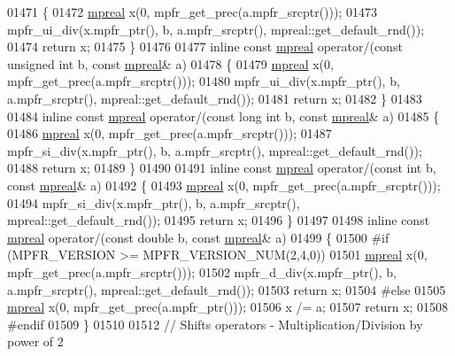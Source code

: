 \begin{DoxyCode}
01471 \{
01472     \hyperlink{classmpfr_1_1mpreal}{mpreal} x(0, mpfr\_get\_prec(a.mpfr\_srcptr()));
01473     mpfr\_ui\_div(x.mpfr\_ptr(), b, a.mpfr\_srcptr(), mpreal::get\_default\_rnd());
01474     \textcolor{keywordflow}{return} x;
01475 \}
01476 
01477 \textcolor{keyword}{inline} \textcolor{keyword}{const} \hyperlink{classmpfr_1_1mpreal}{mpreal} operator/(\textcolor{keyword}{const} \textcolor{keywordtype}{unsigned} \textcolor{keywordtype}{int} b, \textcolor{keyword}{const} \hyperlink{classmpfr_1_1mpreal}{mpreal}& a)
01478 \{
01479     \hyperlink{classmpfr_1_1mpreal}{mpreal} x(0, mpfr\_get\_prec(a.mpfr\_srcptr()));
01480     mpfr\_ui\_div(x.mpfr\_ptr(), b, a.mpfr\_srcptr(), mpreal::get\_default\_rnd());
01481     \textcolor{keywordflow}{return} x;
01482 \}
01483 
01484 \textcolor{keyword}{inline} \textcolor{keyword}{const} \hyperlink{classmpfr_1_1mpreal}{mpreal} operator/(\textcolor{keyword}{const} \textcolor{keywordtype}{long} \textcolor{keywordtype}{int} b, \textcolor{keyword}{const} \hyperlink{classmpfr_1_1mpreal}{mpreal}& a)
01485 \{
01486     \hyperlink{classmpfr_1_1mpreal}{mpreal} x(0, mpfr\_get\_prec(a.mpfr\_srcptr()));
01487     mpfr\_si\_div(x.mpfr\_ptr(), b, a.mpfr\_srcptr(), mpreal::get\_default\_rnd());
01488     \textcolor{keywordflow}{return} x;
01489 \}
01490 
01491 \textcolor{keyword}{inline} \textcolor{keyword}{const} \hyperlink{classmpfr_1_1mpreal}{mpreal} operator/(\textcolor{keyword}{const} \textcolor{keywordtype}{int} b, \textcolor{keyword}{const} \hyperlink{classmpfr_1_1mpreal}{mpreal}& a)
01492 \{
01493     \hyperlink{classmpfr_1_1mpreal}{mpreal} x(0, mpfr\_get\_prec(a.mpfr\_srcptr()));
01494     mpfr\_si\_div(x.mpfr\_ptr(), b, a.mpfr\_srcptr(), mpreal::get\_default\_rnd());
01495     \textcolor{keywordflow}{return} x;
01496 \}
01497 
01498 \textcolor{keyword}{inline} \textcolor{keyword}{const} \hyperlink{classmpfr_1_1mpreal}{mpreal} operator/(\textcolor{keyword}{const} \textcolor{keywordtype}{double}  b, \textcolor{keyword}{const} \hyperlink{classmpfr_1_1mpreal}{mpreal}& a)
01499 \{
01500 \textcolor{preprocessor}{#if (MPFR\_VERSION >= MPFR\_VERSION\_NUM(2,4,0))}
01501     \hyperlink{classmpfr_1_1mpreal}{mpreal} x(0, mpfr\_get\_prec(a.mpfr\_srcptr()));
01502     mpfr\_d\_div(x.mpfr\_ptr(), b, a.mpfr\_srcptr(), mpreal::get\_default\_rnd());
01503     \textcolor{keywordflow}{return} x;
01504 \textcolor{preprocessor}{#else}
01505     \hyperlink{classmpfr_1_1mpreal}{mpreal} x(0, mpfr\_get\_prec(a.mpfr\_ptr()));
01506     x /= a;
01507     \textcolor{keywordflow}{return} x;
01508 \textcolor{preprocessor}{#endif}
01509 \}
01510 
01512 \textcolor{comment}{// Shifts operators - Multiplication/Division by power of 2}

\end{DoxyCode}
